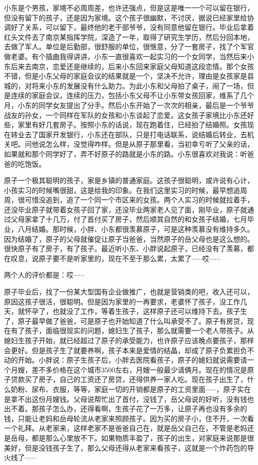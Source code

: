 小东是个男孩，家境不必周周差，也许还强点，但是这是唯一一个可以留在银行，但没有留下的孩子，还是因为家境。这个孩子很幽默，不讨厌，据说已经家里给协调好了关系，可以留下，最终他的老干部爷爷，没有同意他留在银行。毕业后拿着红头文件去了南京某指挥学院，深造了一年，取得了研究生学历，然后分回本地，去做了军人。单位是后勤部，很舒服的单位，很惬意，分了一套房子，找了个军官做老婆。有个插曲我得讲讲，小东一直很喜欢一起实习的一个女同学，当然后来小东后来去南京，恋爱还是继续的，后来小东回来家庭父母知道这段恋情。那个女孩不错，但是小东父母的家庭会议的结果就是一个，坚决不允许，理由是女孩家是县城的，对将来小东的发展没有什么助力。为此小东和父母拍了桌子，闹了一场，但是连续的家庭会议，连续的压力，包括小东父母不让小东带女孩回家，维系了几个月，小东的同学女友提出了分手。然后小东开始了一次次的相亲，最后是一个爷爷战友的孙女，一个同样在军队的女孩和小东谈起了恋爱。这女孩子家境比小东还好些，家里有好几套房子。按照小东的话说，现在跑着住，已经拍了结婚照。女孩现在转业去了国家开发银行，小东还在部队，只是打电话联系，说结婚后转业，去机关吧。问他说怎么样，没觉得咋样。但是从原子那里看，当初幸亏听了父亲的话，如果就和那个同学好了，弄不好原子的路就是小东的路。小东很喜欢对我说：听爸爸的吃饱饭。

原子一个极其聪明的孩子，家是乡镇的普通家庭。这孩子很聪明，或许说有心计，小孩实习的时候嘴很甜，这是给我的印象。在我们这里实习的时候，最早想追周周，很可惜没追到，追了一个同一个市区来的女孩。两个人实习的时候就拉着手，还没毕业原子就带着女孩子回了家，还没毕业两家老人见了面，刚毕业，原子就通过父母家拿了十几万，付了首付买了房子，然后顺其自然的和女孩子结婚，七月毕业，八月结婚。那时候，小胖、小东都很羡慕原子，可是这种羡慕没有维持多久。因为结婚了，原子的父母就催促让原子当爸爸，当然原子的岳父母也是这么想的。很快原子有了房子，有了孩子。最近听小东、小胖说起原子，已经没有了羡慕，都在叹息，说原子要不是听家里的，现在不至于那么累，太累了$\cdots\cdots$哎$\cdots\cdots$

两个人的评价都是：哎$\cdots\cdots$

原子毕业后，找了一份某大型国有企业做推广，也就是营销类的吧，收入还可以，原因这孩子很活，很聪明。但是因为家里的一再要求，老婆怀了孩子，没工作几天，就怀孕了，也就没了工作，等着生孩子，这样原子还可以维持下去。孩子生了，原子最早做了爸爸，可是原子也开始知道了什么叫承受不了。原子有房贷，现在有了孩子，面临很现实的问题，媳妇生了孩子，那么就需要一个老人带孩子。从媳妇生孩子开始，就已经超过了原子的承受能力，也许原子应该晚点要孩子，那样会更好。但是孩子生了就要养啊，孩子本来是爱情的结晶，却成了原子负累担负不动的开始。小胖说：原子生孩子后，小胖去医院看孩子，原子的媳妇就说需要请一个月嫂，差不多价格在这个城市3500左右，月嫂一般最少请俩月。现在的情况是原子贷款买了房子，自己的工资还了房贷，还得供养一家人吃。现在孩子出生了，什么奶粉、尿布、衣服，等等，家庭一切的开销都是原子的工资里面$\cdots\cdots$，原子实在是拿不出这份月嫂钱。父母说帮忙出了首付，没钱了，岳父母说的好听，没有钱也出不着。那孩子怎么办，还得看啊，生孩子花了一万多，让原子再也没有多余的钱，只能让老妈和岳母轮流从老家来照顾孩子。因为买的房子小，住不开，一次看一个礼拜。从老家来，这样老家不是爸爸自己在，就是岳父自己在，不管是老妈还是岳母，都是那么心里放不下。如果物质丰盈了，孩子的出生，对家庭来说那是很美好，但是没钱孩子生了，那么父母还得从老家来看孩子，这就是一个炸药包的导火线了$\cdots\cdots$

